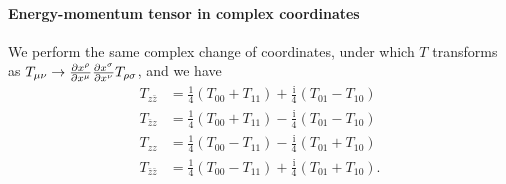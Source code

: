\documentclass[10pt]{article}
\newcommand{\ii}{\mathrm{i}}
\begin{document}
\paragraph{Energy-momentum tensor in complex coordinates}
We perform the same complex change of coordinates, under which $T$ transforms as $T_{\mu\nu}\to\pdv{x^\rho}{x^\mu}\pdv{x^\sigma}{x^\nu}T_{\rho\sigma}$, and we have%
\begin{subequations}\label{eq:emtcc:EMT}
    \begin{align}
        T_{z\bar{z}}       & =\frac{1}{4}\left(T_{00}+T_{11}\right)+\frac{\ii}{4}\left(T_{01}-T_{10}\right)  \\
        T_{\bar{z}z}       & =\frac{1}{4}\left(T_{00}+T_{11}\right)-\frac{\ii}{4}\left(T_{01}-T_{10}\right)  \\
        T_{zz}             & =\frac{1}{4}\left(T_{00}-T_{11}\right)-\frac{\ii}{4}\left(T_{01}+T_{10}\right)  \\
        T_{\bar{z}\bar{z}} & =\frac{1}{4}\left(T_{00}-T_{11}\right)+\frac{\ii}{4}\left(T_{01}+T_{10}\right).
    \end{align}
\end{subequations}
\end{document}
